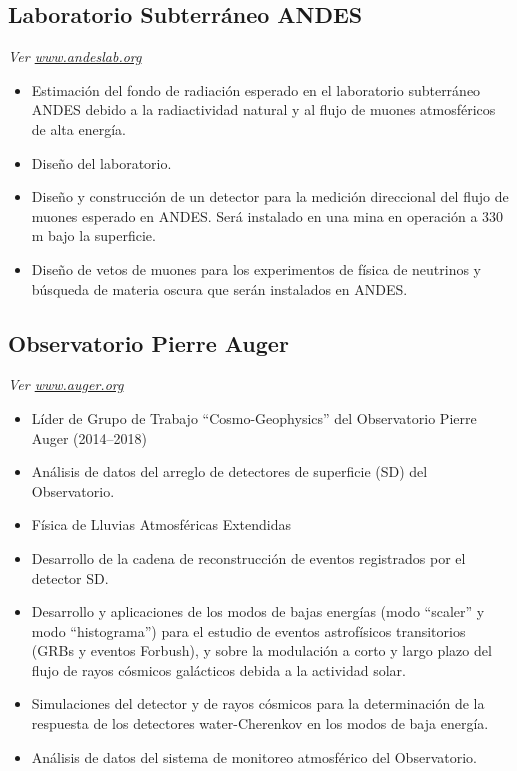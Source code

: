 \subsection*{Laboratorio Subterráneo ANDES}
{\small{\textit{Ver \href{http://www.andeslab.org}{www.andeslab.org}}}}
\begin{itemize}
\item Estimación del fondo de radiación esperado en el laboratorio subterráneo ANDES debido a la radiactividad natural y al flujo de muones atmosféricos de alta energía.
\item Diseño del laboratorio.
\item Diseño y construcción de un detector para la medición direccional del flujo de muones esperado en ANDES. Será instalado en una mina en operación a 330 m bajo la superficie.
\item Diseño de vetos de muones para los experimentos de física de neutrinos y búsqueda de materia oscura que serán instalados en ANDES\@.
\end{itemize}

\subsection*{Observatorio Pierre Auger}
{\small{\textit{Ver \href{http://www.auger.org/}{www.auger.org}}}}
\begin{itemize}
\item Líder de Grupo de Trabajo ``Cosmo-Geophysics'' del Observatorio Pierre Auger (2014--2018)
\item Análisis de datos del arreglo de detectores de superficie (SD) del Observatorio.
\item Física de Lluvias Atmosféricas Extendidas
\item Desarrollo de la cadena de reconstrucción de eventos registrados por el detector SD\@.
\item Desarrollo y aplicaciones de los modos de bajas energías (modo ``scaler'' y modo ``histograma'') para el estudio de eventos astrofísicos transitorios (GRBs y eventos Forbush), y sobre la modulación a corto y largo plazo del flujo de rayos cósmicos galácticos debida a la actividad solar.
\item Simulaciones del detector y de rayos cósmicos para la determinación de la respuesta de los detectores water-Cherenkov en los modos de baja energía.
\item Análisis de datos del sistema de monitoreo atmosférico del Observatorio.
\end{itemize}

